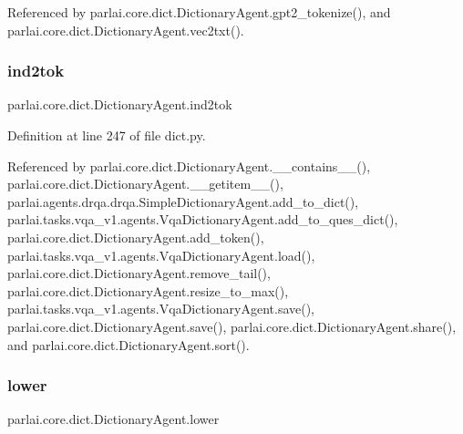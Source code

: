 Referenced by parlai.\+core.\+dict.\+Dictionary\+Agent.\+gpt2\+\_\+tokenize(), and parlai.\+core.\+dict.\+Dictionary\+Agent.\+vec2txt().

\mbox{\label{classparlai_1_1core_1_1dict_1_1DictionaryAgent_af425a3810b9c85ac73d9b77a9ee100e6}} 
\subsubsection{\texorpdfstring{ind2tok}{ind2tok}}
{\footnotesize\ttfamily parlai.\+core.\+dict.\+Dictionary\+Agent.\+ind2tok}



Definition at line 247 of file dict.\+py.



Referenced by parlai.\+core.\+dict.\+Dictionary\+Agent.\+\_\+\+\_\+contains\+\_\+\+\_\+(), parlai.\+core.\+dict.\+Dictionary\+Agent.\+\_\+\+\_\+getitem\+\_\+\+\_\+(), parlai.\+agents.\+drqa.\+drqa.\+Simple\+Dictionary\+Agent.\+add\+\_\+to\+\_\+dict(), parlai.\+tasks.\+vqa\+\_\+v1.\+agents.\+Vqa\+Dictionary\+Agent.\+add\+\_\+to\+\_\+ques\+\_\+dict(), parlai.\+core.\+dict.\+Dictionary\+Agent.\+add\+\_\+token(), parlai.\+tasks.\+vqa\+\_\+v1.\+agents.\+Vqa\+Dictionary\+Agent.\+load(), parlai.\+core.\+dict.\+Dictionary\+Agent.\+remove\+\_\+tail(), parlai.\+core.\+dict.\+Dictionary\+Agent.\+resize\+\_\+to\+\_\+max(), parlai.\+tasks.\+vqa\+\_\+v1.\+agents.\+Vqa\+Dictionary\+Agent.\+save(), parlai.\+core.\+dict.\+Dictionary\+Agent.\+save(), parlai.\+core.\+dict.\+Dictionary\+Agent.\+share(), and parlai.\+core.\+dict.\+Dictionary\+Agent.\+sort().

\mbox{\label{classparlai_1_1core_1_1dict_1_1DictionaryAgent_a0dc4620f2829a15d822cc29e7fccd677}} 
\subsubsection{\texorpdfstring{lower}{lower}}
{\footnotesize\ttfamily parlai.\+core.\+dict.\+Dictionary\+Agent.\+lower}




